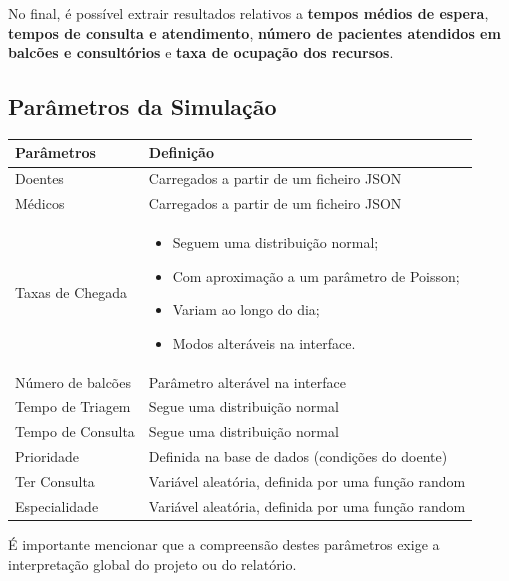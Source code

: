 \documentclass[12pt,a4paper]{article} %
\begin{document}
\medskip
No final, é possível extrair resultados relativos a \textbf{tempos médios de espera}, \textbf{tempos de consulta e atendimento}, \textbf{número de pacientes atendidos em balcões e consultórios} e \textbf{taxa de ocupação dos recursos}.


\newpage
\subsection{Parâmetros da Simulação}

\begin{table}[h]
    \centering
    \begin{tabular}{l p{10cm}}
    \textbf{Parâmetros}   & \textbf{Definição}\\ \hline
    Doentes               & Carregados a partir de um ficheiro JSON\\ 
    Médicos               & Carregados a partir de um ficheiro JSON \\
    Taxas de Chegada      & 
    \begin{itemize}
        \item Seguem uma distribuição normal;
        \item Com aproximação a um parâmetro de Poisson;
        \item Variam ao longo do dia;
        \item Modos alteráveis na interface.
    \end{itemize} \\
    Número de balcões    & Parâmetro alterável na interface\\
    Tempo de Triagem     & Segue uma distribuição normal \\
    Tempo de Consulta    & Segue uma distribuição normal\\
    Prioridade           & Definida na base de dados (condições do doente)\\
    Ter Consulta         & Variável aleatória, definida por uma função random\\
    Especialidade        & Variável aleatória, definida por uma função random\\
    \end{tabular}
\end{table}

É importante mencionar que a compreensão destes parâmetros exige a interpretação global do projeto ou do relatório.

\end{document}
